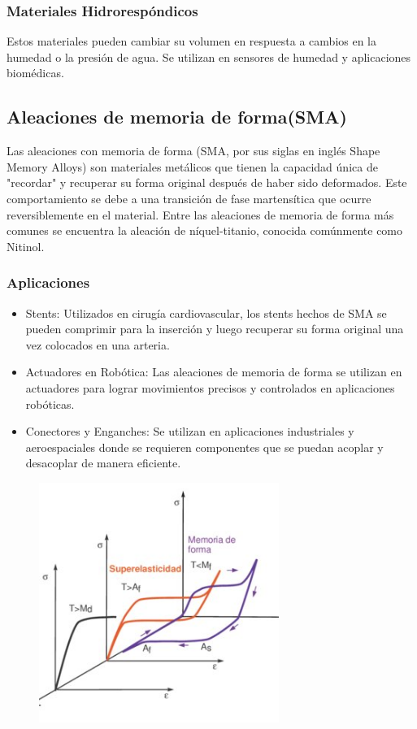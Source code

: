     \subsubsection{Materiales Hidrorespóndicos}
    Estos materiales pueden cambiar su volumen en respuesta a cambios en la humedad o la presión de agua. Se utilizan en sensores de humedad y aplicaciones biomédicas.
\subsection{Aleaciones de memoria de forma(SMA)}
Las aleaciones con memoria de forma (SMA, por sus siglas en inglés Shape Memory Alloys) son materiales metálicos que tienen la capacidad única de "recordar" y recuperar su forma original después de haber sido deformados. Este comportamiento se debe a una transición de fase martensítica que ocurre reversiblemente en el material. Entre las aleaciones de memoria de forma más comunes se encuentra la aleación de níquel-titanio, conocida comúnmente como Nitinol.
    \subsubsection{Aplicaciones}
        \begin{itemize}
            \item Stents: Utilizados en cirugía cardiovascular, los stents hechos de SMA se pueden comprimir para la inserción y luego recuperar su forma original una vez colocados en una arteria.
            \item Actuadores en Robótica: Las aleaciones de memoria de forma se utilizan en actuadores para lograr movimientos precisos y controlados en aplicaciones robóticas.
            \item Conectores y Enganches: Se utilizan en aplicaciones industriales y aeroespaciales donde se requieren componentes que se puedan acoplar y desacoplar de manera eficiente.
        \end{itemize}
        
        \begin{figure}[h]
            \centering
            \includegraphics[height=7.8cm]{assets/figures/SMA.jpg}         
        \end{figure}